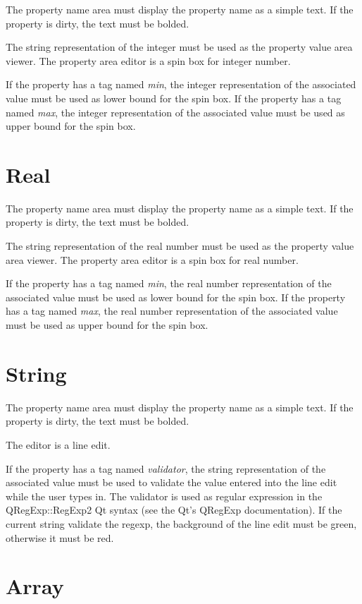 \documentclass[a4paper, twoside]{report}
\begin{document}
The property name area must display the property name as a simple text. If the property is dirty,
the text must be bolded.

The string representation of the integer must be used as the property value area viewer.
The property area editor is a spin box for integer number.

If the property has a tag named \emph{min}, the integer representation of the associated value must
be used as lower bound for the spin box.
If the property has a tag named \emph{max}, the integer representation of the associated value must
be used as upper bound for the spin box.

\section{Real}

The property name area must display the property name as a simple text. If the property is dirty,
the text must be bolded.

The string representation of the real number must be used as the property value area viewer.
The property area editor is a spin box for real number.

If the property has a tag named \emph{min}, the real number representation of the associated value must be used as lower bound for the spin box.
If the property has a tag named \emph{max}, the real number representation of the associated value must be used as upper bound for the spin box.

\section{String}

The property name area must display the property name as a simple text. If the property is dirty,
the text must be bolded.

The editor is a line edit.

If the property has a tag named \emph{validator}, the string representation of the associated value
must be used to validate the value entered into the line edit while the user types in. The validator
is used as regular expression in the QRegExp::RegExp2 Qt syntax (see the Qt's QRegExp
documentation). If the current string validate the regexp, the background of the line edit must be
green, otherwise it must be red.

\section{Array}
\end{document}
